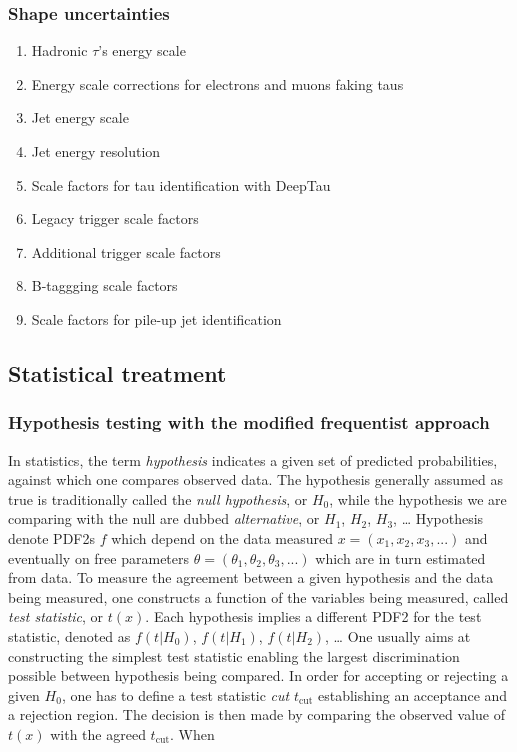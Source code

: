 \documentclass[11pt]{article}
\begin{document}
\subsubsection{Shape uncertainties}
\label{sec:orga56e505}
\begin{enumerate}
\item Hadronic \(\tau\)'s energy scale
\label{sec:orge60a6e0}
\item Energy scale corrections for electrons and muons faking taus
\label{sec:orgf6bdb6b}
\item Jet energy scale
\label{sec:org70d9200}
\item Jet energy resolution
\label{sec:orgc18f1e3}
\item Scale factors for tau identification with DeepTau
\label{sec:orgd8fe46a}
\item Legacy trigger scale factors
\label{sec:org354e836}
\item Additional trigger scale factors
\label{sec:org947a758}
\item B-taggging scale factors
\label{sec:orgcfd47a9}
\item Scale factors for pile-up jet identification
\label{sec:orgdcccd3a}
\end{enumerate}
\subsection{Statistical treatment}
\label{sec:orgbdc20bc}
\subsubsection{Hypothesis testing with the modified frequentist approach}
\label{sec:org128a219}
In statistics, the term \emph{hypothesis} indicates a given set of predicted probabilities, against which one compares observed data.
The hypothesis generally assumed as true is traditionally called the \emph{null hypothesis}, or \(H_{0}\), while the hypothesis we are comparing with the null are dubbed \emph{alternative}, or \(H_{1}\), \(H_{2}\), \(H_{3}\), \ldots{}
Hypothesis denote \acp{PDF2} \(f\) which depend on the data measured \(x = (x_1,x_2,x_3,...)\) and eventually on free parameters \(\theta = (\theta_1,\theta_2,\theta_3,...)\) which are in turn estimated from data.
To measure the agreement between a given hypothesis and the data being measured, one constructs a function of the variables being measured, called \emph{test statistic}, or \(t(x)\).
Each hypothesis implies a different \ac{PDF2} for the test statistic, denoted as \(f(t|H_0)\), \(f(t|H_1)\), \(f(t|H_2)\), \ldots{}
One usually aims at constructing the simplest test statistic enabling the largest discrimination possible between hypothesis being compared.
In order for accepting or rejecting a given \(H_0\), one has to define a test statistic \emph{cut} \(t_{\text{cut}}\) establishing an acceptance and a rejection region.
The decision is then made by comparing the observed value of \(t(x)\) with the agreed \(t_{\text{cut}}\).
When
\end{document}
